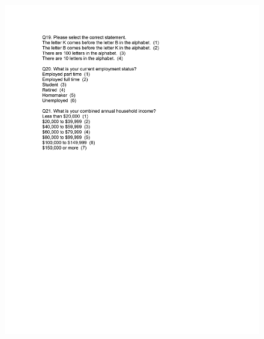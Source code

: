 \documentclass[12pt,econ]{sources/authesis}
\makeatletter
\def\maxwidth{\ifdim\Gin@nat@width>\linewidth\linewidth
\else\Gin@nat@width\fi}
\let\Oldincludegraphics\includegraphics
\renewcommand{\includegraphics}[1]{\Oldincludegraphics[width=\maxwidth]{#1}}
\makeatother
\begin{document}
\begin{figure}[hbt]
  \centering
\includegraphics{data/framing/appendix/questionnaire/questionnaire10.jpg}
\end{figure}
\end{document}
